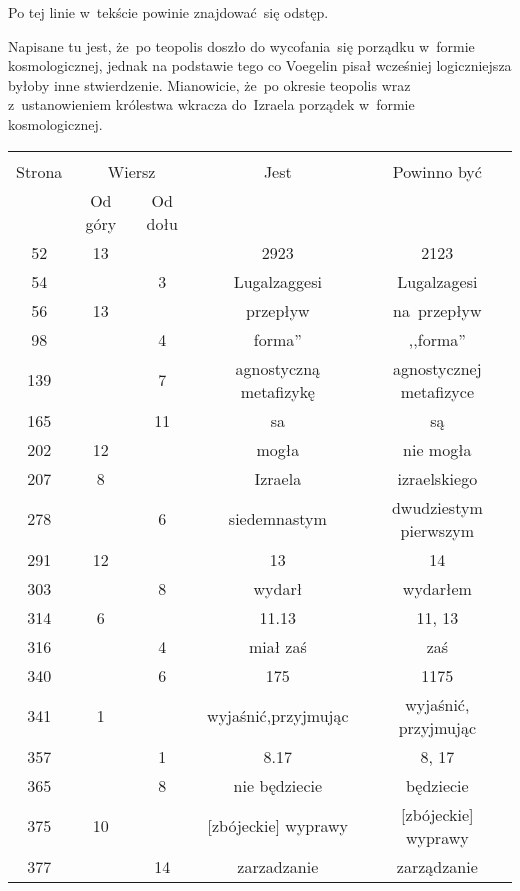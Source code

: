 \documentclass[a4paper,11pt]{article}
\begin{document}
\vspace{\spaceFour}


\start {} Po tej linie w~tekście powinie znajdować~się
odstęp.

\vspace{\spaceFour}


\start {} Napisane tu jest, że~po teopolis doszło do
wycofania~się porządku w~formie kosmologicznej, jednak na podstawie
tego co Voegelin pisał wcześniej logiczniejsza byłoby inne
stwierdzenie. Mianowicie, że~po okresie teopolis wraz z~ustanowieniem
królestwa wkracza do~Izraela porządek w~formie kosmologicznej.


\begin{center}
  \begin{tabular}{|c|c|c|c|c|}
    \hline
    & \multicolumn{2}{c|}{} & & \\
    Strona & \multicolumn{2}{c|}{Wiersz} & Jest
                              & Powinno być \\ \cline{2-3}
    & Od góry & Od dołu & & \\
    \hline
    52  & 13 & & 2923 & 2123 \\
    54  & &  3 & Lugalzaggesi & Lugalzagesi \\
    56  & 13 & & przepływ & na~przepływ \\
    98  & &  4 & forma'' & ,,forma'' \\
    139 & &  7 & agnostyczną metafizykę & agnostycznej metafizyce \\
    165 & & 11 & sa & są \\
    202 & 12 & & mogła & nie mogła \\
    207 &  8 & & Izraela & izraelskiego \\
    278 & &  6 & siedemnastym & dwudziestym pierwszym \\
    291 & 12 & & 13 & 14 \\
    303 & &  8 & wydarł & wydarłem \\
    314 &  6 & & 11.13 & 11, 13 \\
    316 & &  4 & miał zaś & zaś \\
    340 & &  6 & 175 & 1175 \\
    341 &  1 & & wyjaśnić,przyjmując & wyjaśnić, przyjmując \\
    357 & &  1 & 8.17 & 8, 17 \\
    365 & &  8 & nie będziecie & będziecie \\
    375 & 10 & & [zbójeckie]{ } wyprawy & [zbójeckie] wyprawy \\
    377 & & 14 & zarzadzanie & zarządzanie \\
    \hline
  \end{tabular}
\end{center}
\end{document}
